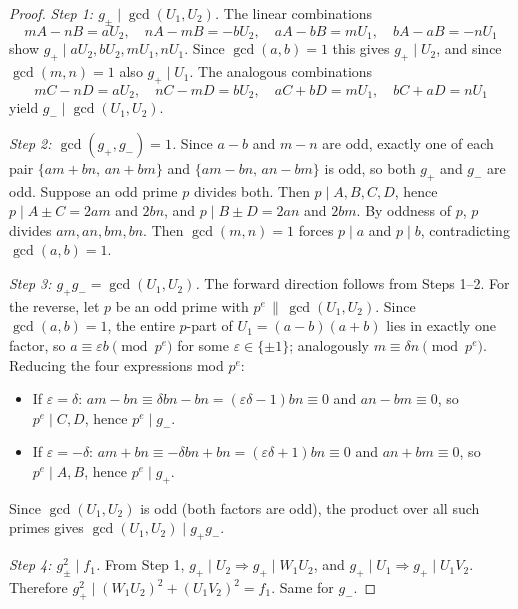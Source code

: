\documentclass[10pt,a4paper]{amsart}
\begin{document}
\begin{proof}
\emph{Step 1: $g_\pm \mid \gcd(U_1, U_2)$.} The linear combinations
$$
mA - nB = aU_2,\quad nA - mB = -bU_2,\quad
aA - bB = mU_1,\quad bA - aB = -nU_1
$$
show $g_+ \mid aU_2, bU_2, mU_1, nU_1$. Since $\gcd(a, b) = 1$ this gives $g_+ \mid U_2$, and since $\gcd(m, n) = 1$ also $g_+ \mid U_1$. The analogous combinations
$$
mC - nD = aU_2,\quad nC - mD = bU_2,\quad
aC + bD = mU_1,\quad bC + aD = nU_1
$$
yield $g_- \mid \gcd(U_1, U_2)$.

\emph{Step 2: $\gcd(g_+, g_-) = 1$.} Since $a - b$ and $m - n$ are odd, exactly one of each pair $\{am + bn, \, an + bm\}$ and $\{am - bn,\, an - bm\}$ is odd, so both $g_+$ and $g_-$ are odd. Suppose an odd prime $p$ divides both. Then $p \mid A, B, C, D$, hence $p \mid A \pm C = 2am$ and $2bn$, and $p \mid B \pm D = 2an$ and $2bm$. By oddness of $p$, $p$ divides $am, an, bm, bn$. Then $\gcd(m, n) = 1$ forces $p \mid a$ and $p \mid b$, contradicting $\gcd(a, b) = 1$.

\emph{Step 3: $g_+ g_- = \gcd(U_1, U_2)$.} The forward direction follows from Steps 1--2. For the reverse, let $p$ be an odd prime with $p^e \,\|\, \gcd(U_1, U_2)$. Since $\gcd(a, b) = 1$, the entire $p$-part of $U_1 = (a-b)(a+b)$ lies in exactly one factor, so $a \equiv \varepsilon b \pmod{p^e}$ for some $\varepsilon \in \{\pm 1\}$; analogously $m \equiv \delta n \pmod{p^e}$. Reducing the four expressions mod $p^e$:
\begin{itemize}
    \item If $\varepsilon = \delta$: $am - bn \equiv \delta bn - bn = (\varepsilon\delta - 1)bn \equiv 0$ and $an - bm \equiv 0$, so $p^e \mid C, D$, hence $p^e \mid g_-$.
    \item If $\varepsilon = -\delta$: $am + bn \equiv -\delta bn + bn = (\varepsilon\delta + 1)bn \equiv 0$ and $an + bm \equiv 0$, so $p^e \mid A, B$, hence $p^e \mid g_+$.
\end{itemize}
Since $\gcd(U_1, U_2)$ is odd (both factors are odd), the product over all such primes gives $\gcd(U_1, U_2) \mid g_+ g_-$.

\emph{Step 4: $g_\pm^2 \mid f_1$.} From Step 1, $g_+ \mid U_2 \Rightarrow g_+ \mid W_1 U_2$, and $g_+ \mid U_1 \Rightarrow g_+ \mid U_1 V_2$. Therefore $g_+^2 \mid (W_1 U_2)^2 + (U_1 V_2)^2 = f_1$. Same for $g_-$.
\end{proof}
\end{document}
